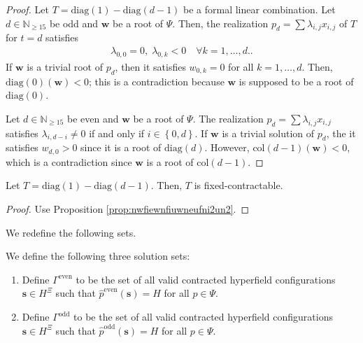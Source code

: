 \begin{proof}
    Let \( T = \mathrm{diag}(1) - \mathrm{diag}(d-1) \) be a formal linear combination. Let \( d \in \mathbb{N}_{\geq 15} \) be odd and \( \mathbf{w} \) be a root of \( \Psi \). Then, the realization \( p_d = \sum \lambda_{i,j}x_{i,j}\) of \( T \) for \( t = d \) satisfies 
    \begin{align*}
        \lambda_{0,0} = 0, \;  \lambda_{0,k} < {0} \quad \forall k = 1, \dots, d..
    \end{align*}
     If \( \mathbf{w} \) is a trivial root of \( p_d \), then it satisfies \( w_{0,k} = 0 \) for all \( k = 1, \dots, d \). Then, \( \mathrm{diag}(0)(\mathbf{w}) < 0 \); this is a contradiction because \( \mathbf{w} \) is supposed to be a root of \( \mathrm{diag}(0) \).
    
    Let \( d \in \mathbb{N}_{\geq 15} \) be even and \( \mathbf{w} \) be a root of \( \Psi \). The realization \( p_d = \sum \lambda_{i,j}x_{i,j} \) satisfies \( \lambda_{i,d-i} \neq 0 \) if and only if \( i \in \left\{ 0, d \right\} \). If \( \mathbf{w} \) is a trivial solution of \( p_d \), the it satisfies \( w_{d,0} > 0 \) since it is a root of \( \mathrm{diag}(d) \). However, \( \mathrm{col}(d-1)(\mathbf{w}) < 0 \), which is a contradiction since \( \mathbf{w} \) is a root of \( \mathrm{col}(d-1) \).
\end{proof}

\begin{proposition}
    Let \( T = \mathrm{diag}(1) - \mathrm{diag}(d-1)\). Then, \( T \) is fixed-contractable.
\end{proposition}

\begin{proof}
    Use Proposition \ref{prop:nwfiewnfiuwneufni2un2}.
\end{proof}

We redefine the following sets.

\begin{definition}
    We define the following three solution sets:
    \begin{enumerate}
        \item     Define \( \Gamma^{\mathrm{even}} \) to be the set of all valid contracted hyperfield configurations \( \mathbf{s} \in H^{\Xi} \) such that \( \hat p^{\mathrm{even}}(\mathbf{s}) = H \) for all \( p \in \Psi \).

        \item     Define \( \Gamma^{\mathrm{odd}} \) to be the set of all valid contracted hyperfield configurations \( \mathbf{s} \in H^{\Xi} \) such that \( \hat p^{\mathrm{odd}}(\mathbf{s}) = H \) for all \( p \in \Psi \).
    \end{enumerate}
\end{definition}

